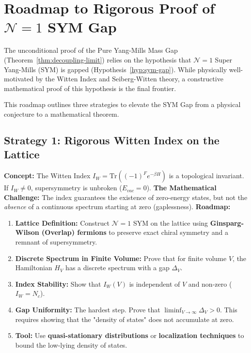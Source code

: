 
\section{Roadmap to Rigorous Proof of \texorpdfstring{$\mathcal{N}=1$}{N=1} SYM Gap}
\label{app:sym-gap-roadmap}

The unconditional proof of the Pure Yang-Mills Mass Gap (Theorem~\ref{thm:decoupling-limit}) relies on the hypothesis that $\mathcal{N}=1$ Super Yang-Mills (SYM) is gapped (Hypothesis~\ref{hyp:sym-gap}). While physically well-motivated by the Witten Index and Seiberg-Witten theory, a constructive mathematical proof of this hypothesis is the final frontier.

This roadmap outlines three strategies to elevate the SYM Gap from a physical conjecture to a mathematical theorem.

\subsection{Strategy 1: Rigorous Witten Index on the Lattice}
\textbf{Concept:} The Witten Index $I_W = \text{Tr}((-1)^F e^{-\beta H})$ is a topological invariant. If $I_W \neq 0$, supersymmetry is unbroken ($E_{vac} = 0$).
\textbf{The Mathematical Challenge:} The index guarantees the existence of zero-energy states, but not the \textit{absence} of a continuous spectrum starting at zero (gaplessness).
\textbf{Roadmap:}
\begin{enumerate}
    \item \textbf{Lattice Definition:} Construct $\mathcal{N}=1$ SYM on the lattice using \textbf{Ginsparg-Wilson (Overlap) fermions} to preserve exact chiral symmetry and a remnant of supersymmetry.
    \item \textbf{Discrete Spectrum in Finite Volume:} Prove that for finite volume $V$, the Hamiltonian $H_V$ has a discrete spectrum with a gap $\Delta_V$.
    \item \textbf{Index Stability:} Show that $I_W(V)$ is independent of $V$ and non-zero ($I_W = N_c$).
    \item \textbf{Gap Uniformity:} The hardest step. Prove that $\liminf_{V \to \infty} \Delta_V > 0$. This requires showing that the "density of states" does not accumulate at zero.
    \item \textbf{Tool:} Use \textbf{quasi-stationary distributions} or \textbf{localization techniques} to bound the low-lying density of states.
\end{enumerate}

